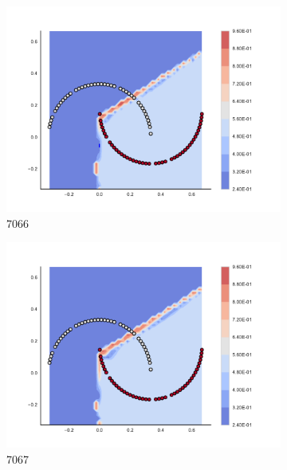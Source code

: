 \begin{figure}[h]
\begin{subfigure}[b]{0.09\textwidth}
    \includegraphics[clip, trim=2.35cm 1.75cm 4.5cm 0cm,width=\textwidth]{img/convergence/7066.pdf}
    \caption{7066}
    \label{fig:convergence_7066}
\end{subfigure}
%
\begin{subfigure}[b]{0.09\textwidth}
    \includegraphics[clip, trim=2.35cm 1.75cm 4.5cm 0cm,width=\textwidth]{img/convergence/7067.pdf}
    \caption{7067}
    \label{fig:convergence_7067}
\end{subfigure}
%
\begin{subfigure}[b]{0.09\textwidth}

\end{subfigure}
\end{figure}

